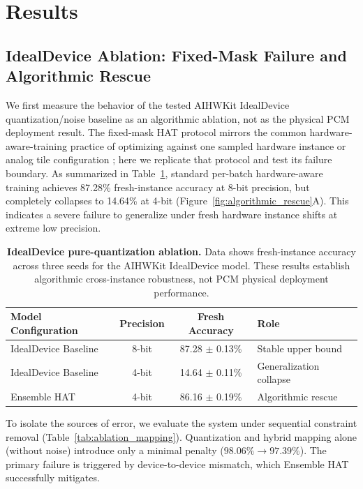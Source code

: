 \section{Results}
\label{sec:results}

\subsection{IdealDevice Ablation: Fixed-Mask Failure and Algorithmic Rescue}
\label{subsec:failure-rescue}

We first measure the behavior of the tested AIHWKit IdealDevice quantization/noise baseline as an algorithmic ablation, not as the physical PCM deployment result. The fixed-mask HAT protocol mirrors the common hardware-aware-training practice of optimizing against one sampled hardware instance or analog tile configuration \citep{joshi2020accurate,rasch2021aihwkit}; here we replicate that protocol and test its failure boundary. As summarized in Table~\ref{tab:algorithmic_rescue}, standard per-batch hardware-aware training achieves 87.28\% fresh-instance accuracy at 8-bit precision, but completely collapses to 14.64\% at 4-bit (Figure~\ref{fig:algorithmic_rescue}A). This indicates a severe failure to generalize under fresh hardware instance shifts at extreme low precision.

\begin{table}[htbp]
\centering
\caption{\textbf{IdealDevice pure-quantization ablation.} Data shows fresh-instance accuracy across three seeds for the AIHWKit IdealDevice model. These results establish algorithmic cross-instance robustness, not PCM physical deployment performance.}
\label{tab:algorithmic_rescue}
\begin{tabular}{lccl}
\toprule
\textbf{Model Configuration} & \textbf{Precision} & \textbf{Fresh Accuracy} & \textbf{Role} \\
\midrule
IdealDevice Baseline & 8-bit & 87.28 $\pm$ 0.13\% & Stable upper bound \\
IdealDevice Baseline & 4-bit & 14.64 $\pm$ 0.11\% & Generalization collapse \\
Ensemble HAT & 4-bit & 86.16 $\pm$ 0.19\% & Algorithmic rescue \\
\bottomrule
\end{tabular}
\end{table}

To isolate the sources of error, we evaluate the system under sequential constraint removal (Table~\ref{tab:ablation_mapping}). Quantization and hybrid mapping alone (without noise) introduce only a minimal penalty ($98.06\% \rightarrow 97.39\%$). The primary failure is triggered by device-to-device mismatch, which Ensemble HAT successfully mitigates.


